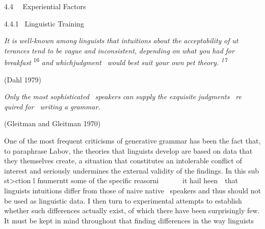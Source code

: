 \begin{styleHeadingvii}
4.4 \ \ Experiential Factors
\end{styleHeadingvii}


\begin{styleHeadingviii}
4.4.1 \ Linguistic Training
\end{styleHeadingviii}


\begin{styleStandard}
\textit{It}\textit{ }\textit{is}\textit{ }\textit{well-known}\textit{ }\textit{among}\textit{ }\textit{linguists}\textit{ }\textit{that}\textit{ }\textit{intuitions}\textit{ }\textit{about}\textit{ }\textit{the}\textit{ }\textit{acceptability}\textit{ }\textit{of}\textit{ }\textit{ut\-}\textit{ }\textit{terances}\textit{ }\textit{tend}\textit{ }\textit{to}\textit{ }\textit{be}\textit{ }\textit{vague}\textit{ }\textit{and}\textit{ }\textit{inconsistent,}\textit{ }\textit{depending}\textit{ }\textit{on}\textit{ }\textit{what}\textit{ }\textit{you}\textit{ }\textit{had}\textit{ }\textit{for}\textit{ }\textit{breakfast}\textit{ }\textsuperscript{16}\textsuperscript{ }\textit{and}\textit{ }\textit{whic}\textit{h}\textit{judgment }\textit{\ }\textit{would}\textit{ }\textit{best}\textit{ }\textit{suit}\textit{ }\textit{your}\textit{ }\textit{own}\textit{ }\textit{pet}\textit{ }\textit{theory.}\textit{ }\textit{\textsuperscript{17}}
\end{styleStandard}


\begin{styleStandard}
(Dahl 1979)
\end{styleStandard}


\begin{styleStandard}
\textit{Only}\textit{ }\textit{the}\textit{ }\textit{most}\textit{ }\textit{sophisticated }\textit{\ }\textit{speakers}\textit{ }\textit{can}\textit{ }\textit{supply}\textit{ }\textit{the}\textit{ }\textit{exquisite}\textit{ }\textit{judgments }\textit{\ }\textit{re\-}\textit{ }\textit{quired}\textit{ }\textit{for \ writing}\textit{ }\textit{a}\textit{ }\textit{grammar.}
\end{styleStandard}


\begin{styleStandard}
(Gleitman and Gleitman 1970)
\end{styleStandard}


\begin{styleStandard}
One of the most frequent criticisms of generative grammar has been the fact that, to paraphrase Labov, the theories that linguists develop are based on data that they themselves create, a situation that constitutes an intolerable conflict of interest and seriously undermines the external validity of the findings. In this sub\- st{\textgreater}ction l f{\textquotesingle}numerntt{\textquotesingle} some of the specific reasorni \ \ \ \ \ \ it hail heen\ \ that linguists{\textquotesingle} intuitions differ from those of naive native \ speakers and thus should not be used as linguistic data. I then turn to experimental attempts to establish whether such differences actually exist, of which there have been surprisingly few. It must be kept in mind throughout that finding differences in the way linguists
\end{styleStandard}



